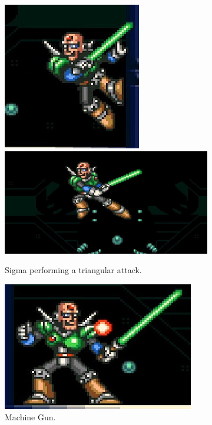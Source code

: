 \begin{figure}[htp]
	\centering
	\begin{subfigure}{\linewidth}
		\centering
		\includegraphics[width=0.3\linewidth]{figures/X1/Sigma_stages/Sigma_leap_3.jpg}
		\includegraphics[width=0.64
		\linewidth]{figures/X1/Sigma_stages/Sigma_leap.jpg}
		\caption{Sigma performing a triangular attack.}
	\end{subfigure}
	\begin{subfigure}[t]{0.43\linewidth}
		\centering
		\includegraphics[width=\linewidth]{figures/X1/Sigma_stages/Sigma_plasma.jpg}
		\caption{Machine Gun.}
	\end{subfigure}
	\begin{subfigure}[t]{0.4\linewidth}
		\centering

\end{subfigure}
\end{figure}
